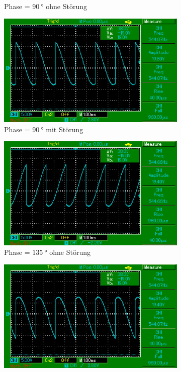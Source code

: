 \begin{figure}[H]
\begin{subfigure}{0.495\linewidth}
        \caption{Phase = $\SI{90}{\degree}$ ohne Störung}
        \label{fig:3c}
    \end{subfigure}
    \begin{subfigure}{0.495\linewidth}
        \centering
        \includegraphics[width=\textwidth]{images/aufg3_phi90.jpg}
        \caption{Phase = $\SI{90}{\degree}$ mit Störung}
        \label{fig:3d}
    \end{subfigure}
    \begin{subfigure}{0.495\linewidth} %
        \centering
        \includegraphics[width=\textwidth]{images/aufg2_phi135.jpg}
        \caption{Phase = $\SI{135}{\degree}$ ohne Störung}
        \label{fig:3e}
    \end{subfigure}
    \begin{subfigure}{0.495\linewidth}
        \centering
        \includegraphics[width=\textwidth]{images/aufg3_phi135.jpg}

\end{subfigure}
\end{figure}

